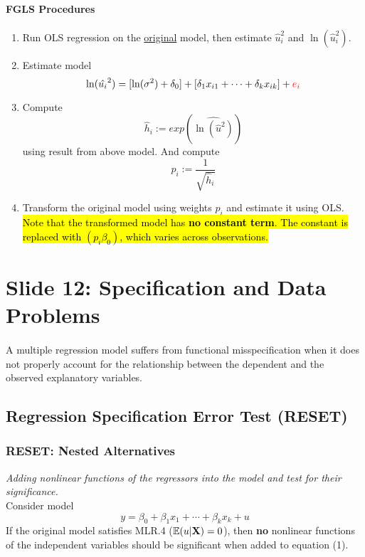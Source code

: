 \documentclass[]{article}
\begin{document}
			\paragraph{FGLS Procedures}
				\begin{enumerate}
					\item Run OLS regression on the \ul{original} model, then estimate $\hat{u}_i^2$ and $\ln(\hat{u}_i^2)$.
					\item Estimate model 
						\[
							\ln(\hat{u_i}^2) = [\ln(\sigma^2) + \delta_0] + [\delta_1 x_{i1} + \dots + \delta_k x_{ik}] + \textcolor{red}{e_i}
						\]
					\item Compute 
						\[
							\hat{h}_i := exp(\widehat{\ln(\hat{u}^2)})
						\]
					using result from above model. And compute 
					\[
						p_i := \frac{1}{\sqrt{\hat{h}_i}}
					\]
					\item Transform the original model using weights $p_i$ and estimate it using OLS. \hl{Note that the transformed model has \textbf{no constant term}. The constant is replaced with $(p_i \beta_0)$, which varies across observations.}
				\end{enumerate}
	\section{Slide 12: Specification and Data Problems}
		\paragraph{} A multiple regression model suffers from functional misspecification when it does not properly account for the relationship between the dependent and the observed explanatory variables.
		\subsection{Regression Specification Error Test (RESET)}
		\subsubsection{RESET: Nested Alternatives}
			\par \emph{Adding nonlinear functions of the regressors into the model and test for their significance.}
			\\
			Consider model 
			\begin{equation}
				y = \beta_0 + \beta_1 x_1 + \cdots + \beta_k x_k + u
			\end{equation}
			If the original model satisfies MLR.4 ($\mathbb{E}({u|\textbf{X}})=0$), then \textbf{no} nonlinear functions of the independent variables should be significant when added to equation (1). 
			
\end{document}

